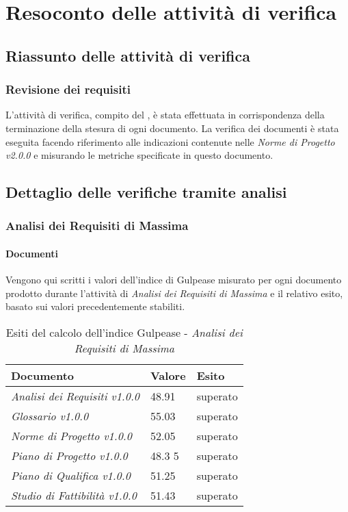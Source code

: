 \appendix
\section{Resoconto delle attività di verifica}
	\subsection{Riassunto delle attività di verifica}
	\subsubsection{Revisione dei requisiti}
	L'attività di verifica, compito del \emph{}, è stata effettuata in corrispondenza della terminazione della stesura di ogni documento. La verifica dei documenti è stata eseguita facendo riferimento alle indicazioni contenute nelle \emph{Norme di Progetto v2.0.0} e misurando le metriche specificate in questo documento.	
	
	\subsection{Dettaglio delle verifiche tramite analisi}
	\subsubsection{Analisi dei Requisiti di Massima}
	\paragraph{Documenti} \Spazio
	Vengono qui scritti i valori dell'indice di Gulpease misurato per ogni documento prodotto durante l'attività di \textit{Analisi dei Requisiti di Massima} e il relativo esito, basato sui valori precedentemente stabiliti.
	
	\begin{table}[H]
		\centering
		\begin{tabular}{|C{7cm}|C{2cm}|C{2cm}|}
			\hline
			\textbf{Documento} & \textbf{Valore} & \textbf{Esito}  \\
			\hline
			\textit{Analisi dei Requisiti v1.0.0} & 48.91 & superato \\
			\hline
			\textit{Glossario v1.0.0} & 55.03 & superato \\
			\hline
			\textit{Norme di Progetto v1.0.0} & 52.05 & superato \\
			\hline
			\textit{Piano di Progetto v1.0.0} & 48.3	5 & superato \\
			\hline
			\textit{Piano di Qualifica v1.0.0} & 51.25 & superato \\
			\hline
			\textit{Studio di Fattibilità v1.0.0} & 51.43 & superato \\
			\hline
			
		\end{tabular}
		\caption{Esiti del calcolo dell'indice Gulpease - \textit{Analisi dei Requisiti di Massima}}
	\end{table}
